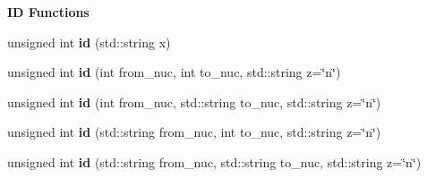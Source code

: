 \begin{Indent}{\bf I\+D Functions}
\begin{DoxyCompactItemize}
\item 
\hypertarget{namespacepyne_1_1rxname_a9b0d87bb265015fa308a8a601a89c738}{unsigned int {\bfseries id} (std\+::string x)}\label{namespacepyne_1_1rxname_a9b0d87bb265015fa308a8a601a89c738}

\item 
\hypertarget{namespacepyne_1_1rxname_ac2712f73fe136c8a091ec5b55867c101}{unsigned int {\bfseries id} (int from\+\_\+nuc, int to\+\_\+nuc, std\+::string z=\char`\"{}n\char`\"{})}\label{namespacepyne_1_1rxname_ac2712f73fe136c8a091ec5b55867c101}

\item 
\hypertarget{namespacepyne_1_1rxname_a59db818b92ee0c58e5da5e29ecccb7b3}{unsigned int {\bfseries id} (int from\+\_\+nuc, std\+::string to\+\_\+nuc, std\+::string z=\char`\"{}n\char`\"{})}\label{namespacepyne_1_1rxname_a59db818b92ee0c58e5da5e29ecccb7b3}

\item 
\hypertarget{namespacepyne_1_1rxname_aeef408cf1b26de2f7828c35981db3f88}{unsigned int {\bfseries id} (std\+::string from\+\_\+nuc, int to\+\_\+nuc, std\+::string z=\char`\"{}n\char`\"{})}\label{namespacepyne_1_1rxname_aeef408cf1b26de2f7828c35981db3f88}

\item 
\hypertarget{namespacepyne_1_1rxname_a8b635b6cfe404af21b0a0c7744d911aa}{unsigned int {\bfseries id} (std\+::string from\+\_\+nuc, std\+::string to\+\_\+nuc, std\+::string z=\char`\"{}n\char`\"{})}\label{namespacepyne_1_1rxname_a8b635b6cfe404af21b0a0c7744d911aa}

\end{DoxyCompactItemize}
\end{Indent}
